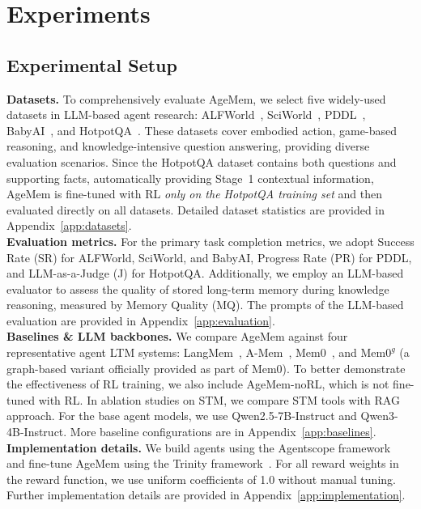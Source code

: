 \section{Experiments}

\subsection{Experimental Setup}

\textbf{Datasets.} To comprehensively evaluate AgeMem, we select five widely-used datasets in LLM-based agent research: ALFWorld~\citep{shridhar2020alfworld}, SciWorld~\citep{wang2022scienceworld}, PDDL~\citep{chang2024agentboard}, BabyAI~\citep{chevalier2018babyai}, and HotpotQA~\citep{yang2018hotpotqa}. These datasets cover embodied action, game-based reasoning, and knowledge-intensive question answering, providing diverse evaluation scenarios. Since the HotpotQA dataset contains both questions and supporting facts, automatically providing Stage~1 contextual information, AgeMem is fine-tuned with RL \textit{only on the HotpotQA training set} and then evaluated directly on all datasets. Detailed dataset statistics are provided in Appendix~\ref{app:datasets}.
\\
\textbf{Evaluation metrics.} For the primary task completion metrics, we adopt Success Rate (SR) for ALFWorld, SciWorld, and BabyAI, Progress Rate (PR) for PDDL, and LLM-as-a-Judge (J) for HotpotQA. Additionally, we employ an LLM-based evaluator to assess the quality of stored long-term memory during knowledge reasoning, measured by Memory Quality (MQ). The prompts of the LLM-based evaluation are provided in Appendix~\ref{app:evaluation}.
\\
\textbf{Baselines \& LLM backbones.} We compare AgeMem against four representative agent LTM systems: LangMem~\citep{langmem2025}, A-Mem~\citep{xu2025mem}, Mem0~\citep{chhikara2025mem0}, and $\text{Mem0}^g$ (a graph-based variant officially provided as part of Mem0). To better demonstrate the effectiveness of RL training, we also include AgeMem-noRL, which is not fine-tuned with RL. In ablation studies on STM, we compare STM tools with RAG approach. For the base agent models, we use Qwen2.5-7B-Instruct and Qwen3-4B-Instruct. More baseline configurations are in Appendix~\ref{app:baselines}.
\\
\textbf{Implementation details.} We build agents using the Agentscope framework~\citep{gao2025agentscope} and fine-tune AgeMem using the Trinity framework~\citep{pan2025trinity}. For all reward weights in the reward function, we use uniform coefficients of 1.0 without manual tuning. Further implementation details are provided in Appendix~\ref{app:implementation}.


